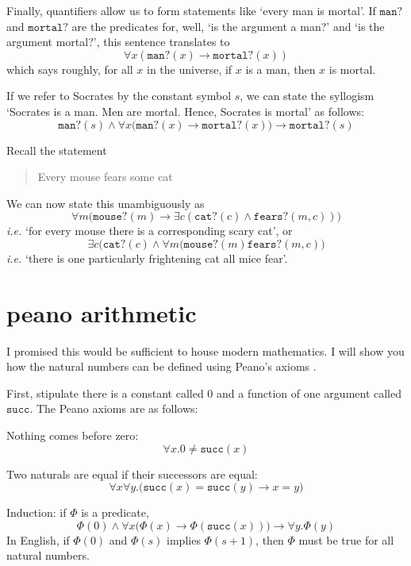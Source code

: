 \documentclass{scrbook}
\renewcommand{\implies}{\to}
\begin{document}
Finally, quantifiers allow us to form statements like `every man is mortal'. If $\texttt{man?}$ and $\texttt{mortal?}$ are the predicates for, well, `is the argument a man?' and `is the argument mortal?', this sentence translates to
\[
\forall x ( \texttt{man?}(x) \implies \texttt{mortal?}(x) )
\]
which says roughly, for all $x$ in the universe, if $x$ is a man, then $x$ is mortal. 

If we refer to Socrates by the constant symbol $s$, we can state the syllogism `Socrates is a man. Men are mortal. Hence, Socrates is mortal' as follows:
\[
\texttt{man?}(s) \wedge \forall x \bigl(\texttt{man?}(x)\implies\texttt{mortal?}(x)\bigr) \implies \texttt{mortal?}(s)
\]

Recall the statement
\begin{quote}
  Every mouse fears some cat
\end{quote}
We can now state this unambiguously as 
\[
\forall m \bigr(\texttt{mouse?}(m) \implies \exists c (\texttt{cat?}(c)\wedge \texttt{fears?}(m,c)) \bigl)
\]
\emph{i.e.} `for every mouse there is a corresponding scary cat', or 
\[
\exists c \bigl(\texttt{cat?}(c) \wedge \forall m (\texttt{mouse?}(m) \texttt{fears?}(m,c)\bigr)
\]
\emph{i.e.} `there is one particularly frightening cat all mice fear'.

\section[Peano Arithmetic]{peano arithmetic}
I promised this would be sufficient to house modern mathematics. I will show you how the natural numbers can be defined using Peano's axioms \cite{wiki:peano}. 

\renewcommand{\succ}{\texttt{succ}}
First, stipulate there is a constant called $0$ and a function of one argument called $\succ$. 
The Peano axioms are as follows: 
\begin{trivlist}
\item Nothing comes before zero:
  \[
  \forall x. 0 \neq \succ(x)
  \]
\item Two naturals are equal if their successors are equal:
  \[
  \forall x\forall y.\bigl( \succ (x) = \succ(y) \implies x=y\bigr)
  \]
\item Induction: if $\Phi$ is a predicate, 
  \[
  \Phi(0) \wedge \forall x \bigl(\Phi(x)\implies \Phi(\succ(x))\bigr) \implies \forall y.\Phi(y)
  \]
  In English, if $\Phi(0)$ and $\Phi(s)$ implies $\Phi(s+1)$, then $\Phi$ must be true for all natural numbers. 
\end{trivlist}
\end{document}
